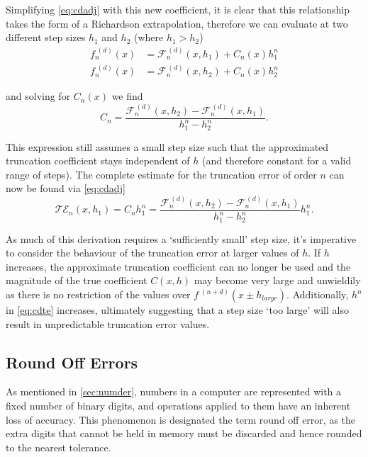 Simplifying \cref{eq:cdadj} with this new coefficient, it is clear that this relationship takes the form of a Richardson extrapolation, therefore we can evaluate at two different step sizes $h_1$ and $h_2$ (where $h_1 > h_2$)
\begin{align}
f_n^{\;(d)}(x) &= \mathcal{F}_n^{\,(d)}(x,h_1) + C_n(x)h_1^n \\
f_n^{\;(d)}(x) &= \mathcal{F}_n^{\,(d)}(x,h_2) + C_n(x)h_2^n
\end{align}

and solving for $C_n(x)$ we find
\begin{equation}
 C_n = \frac{\mathcal{F}_n^{\,(d)}(x,h_2) - \mathcal{F}_n^{\,(d)}(x,h_1)}{h_1^n - h_2^n}.\label{eq:cdtrcoeff}
\end{equation}

This expression still assumes a small step size such that the approximated truncation coefficient stays independent of $h$ (and therefore constant for a valid range of steps).
The complete estimate for the truncation error of order $n$ can now be found via \cref{eq:cdadj}
\begin{equation}
\mathcal{TE}_n(x,h_1) = C_n h_1^n = \frac{\mathcal{F}_n^{\,(d)}(x,h_2) - \mathcal{F}_n^{\,(d)}(x,h_1)}{h_1^n - h_2^n}h_1^n.\label{eq:cdte}
\end{equation}

As much of this derivation requires a `sufficiently small' step size, it's imperative to consider the behaviour of the truncation error at larger values of $h$.
If $h$ increases, the approximate truncation coefficient can no longer be used and
the magnitude of the true coefficient $C(x,h)$ may become very large and unwieldily as there is no restriction of the values over $f^{\;(n+d)}(x\pm h_{large})$.
Additionally, $h^n$ in \cref{eq:cdte} increases, ultimately suggesting that a step size `too large' will also result in unpredictable truncation error values.

\subsection{Round Off Errors}\label{subsec:roundoff}

As mentioned in \cref{sec:numder}, numbers in a computer are represented with a fixed number of binary digits, and operations applied to them have an inherent loss of accuracy.
This phenomenon is designated the term round off error, as the extra digits that cannot be held in memory must be discarded and hence rounded to the nearest tolerance.

